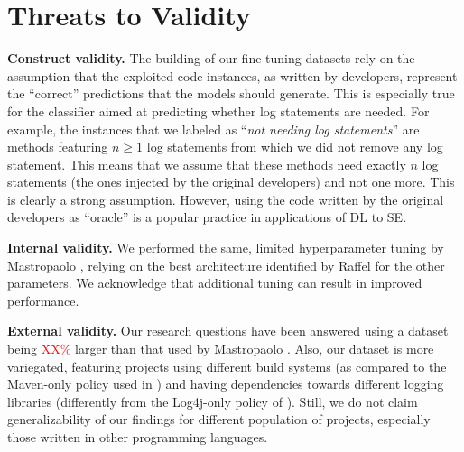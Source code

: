 \section{Threats to Validity} \label{sec:threats}

\textbf{Construct validity.} The building of our fine-tuning datasets rely on the assumption that the exploited code instances, as written by developers, represent the ``correct'' predictions that the models should generate. This is especially true for the classifier aimed at predicting whether log statements are needed. For example, the instances that we labeled as ``\emph{not needing log statements}'' are methods featuring $n \geq 1$ log statements from which we did not remove any log statement. This means that we assume that these methods need exactly $n$ log statements (\ie the ones injected by the original developers) and not one more. This is clearly a strong assumption. However, using the code written by the original developers as ``oracle'' is a popular practice in applications of DL to SE.


\textbf{Internal validity.}  We performed the same, limited hyperparameter tuning by Mastropaolo \etal \cite{mastropaolo2021studying}, relying on the best architecture identified by Raffel \etal \cite{raffel2019exploring} for the other parameters. We acknowledge that additional tuning can result in improved performance.


\textbf{External validity.} Our research questions have been answered using a dataset being \textcolor{red}{XX\%} larger than that used by Mastropaolo \etal \cite{mastropaolo2021studying}. Also, our dataset is more variegated, featuring projects using different build systems (as compared to the Maven-only policy used in \cite{mastropaolo2021studying}) and having dependencies towards different logging libraries (differently from the Log4j-only policy of \cite{mastropaolo2021studying}). Still, we do not claim generalizability of our findings for different population of projects, especially those written in other programming languages.